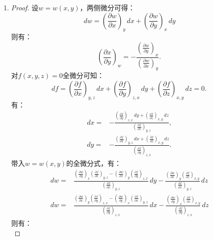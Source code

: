 \documentclass[reqno,a4paper,12pt]{amsart}
\begin{document}
\begin{enumerate}
	\item 
	\begin{proof}
		设$w = w(x, y)$，两侧微分可得：
		\[
			\,d w = \left( \frac{\partial w}{\partial x} \right)_y \,dx + \left( \frac{\partial w}{\partial y} \right)_x \,dy
		\]
		则有：
		\[
			\left( \frac{\partial x}{\partial y} \right)_w = -\frac{\left( \frac{\partial w}{\partial y} \right)_x}{\left( \frac{\partial w}{\partial x} \right)_y}.
		\]
		对$f(x, y, z) = 0$全微分可知：
		\[
			df = \left( \frac{\partial f}{\partial x} \right)_{y, z}\,dx + \left( \frac{\partial f}{\partial y} \right)_{z, x}\,dy + \left( \frac{\partial f}{\partial z} \right)_{x, y}\,dz = 0.
		\]
		有：
		\begin{equation*}
		\begin{aligned}
			\,dx =& -\frac{\left( \frac{\partial f}{\partial y} \right)_{z, x}\,dy + \left( \frac{\partial f}{\partial z} \right)_{x, y}\,dz}{\left( \frac{\partial f}{\partial x} \right)_{y, z}}, \\
			\,dy =& -\frac{\left( \frac{\partial f}{\partial x} \right)_{y, z}\,dx + \left( \frac{\partial f}{\partial z} \right)_{x, y}\,dz}{\left( \frac{\partial f}{\partial y} \right)_{z, x}}.
		\end{aligned}
		\end{equation*}
		带入$w = w(x, y)$的全微分式，有：
		\begin{equation*}
		\begin{aligned}
			\,d w =& \frac{\left( \frac{\partial w}{\partial y} \right)_x \left( \frac{\partial f}{\partial x} \right)_{y, z} - \left( \frac{\partial w}{\partial x} \right)_y \left( \frac{\partial f}{\partial y} \right)_{z, x}}{\left( \frac{\partial f}{\partial x} \right)_{y, z}}\,dy - \frac{\left( \frac{\partial w}{\partial x} \right)_y \left( \frac{\partial f}{\partial z} \right)_{x, y}}{\left( \frac{\partial f}{\partial x} \right)_{y, z}}\,dz \\
			\,d w =& \frac{\left( \frac{\partial w}{\partial x} \right)_y \left( \frac{\partial f}{\partial y} \right)_{z, x} - \left( \frac{\partial w}{\partial y} \right)_x \left( \frac{\partial f}{\partial x} \right)_{y, z}}{\left( \frac{\partial f}{\partial y} \right)_{z, x}}\,dx - \frac{\left( \frac{\partial w}{\partial y} \right)_x \left( \frac{\partial f}{\partial z} \right)_{x, y}}{\left( \frac{\partial f}{\partial y} \right)_{z, x}}\,dz
		\end{aligned}
		\end{equation*}
		则有：
		\begin{equation*}

\end{equation*}
\end{proof}
\end{enumerate}
\end{document}
